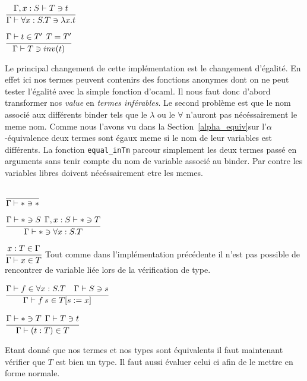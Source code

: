 \documentclass {article}
\newcommand{\codefrom}[3]
           {}
\theoremstyle{definition}
\theoremstyle{remark}
\newcommand{\fun}[1]{\lstinline!#1!}
\begin{document}
\codefrom{dependent}{lambda}{check_abs}
$\cfrac{\Gamma,x:S\vdash T \ni t}
    {\Gamma \vdash \forall x:S.T \ni \lambda x. t}$



\codefrom{dependent}{lambda}{check_inv}
$\cfrac{\Gamma \vdash t \in T' \:\: T=T'}
    {\Gamma\vdash T \ni inv(t)}$

Le principal changement de cette implémentation est le changement d'égalité. 
En effet ici nos termes peuvent contenirs des fonctions anonymes dont on ne peut 
tester l'égalité avec la simple fonction d'ocaml. Il nous faut donc d'abord transformer 
nos \emph{value} en \emph{termes inférables}. Le second problème est que le nom associé 
aux différents binder tels que le $\lambda$ ou le $\forall$ n'auront pas nécéssairement le 
meme nom. Comme nous l'avons vu dans la Section~\ref{alpha_equiv}sur l'$\alpha$-équivalence 
deux termes sont égaux meme si le nom de leur variables est différents. 
La fonction \fun{equal_inTm} parcour simplement les deux termes passé en arguments sans tenir compte
du nom de variable associé au binder. Par contre les variables libres doivent nécéssairement etre les memes.

\codefrom{dependent}{lambda}{check_star}
$\cfrac{}
    {\Gamma \vdash * \ni *}$



\codefrom{dependent}{lambda}{check_pi}
$\cfrac{\Gamma \vdash * \ni S\:\:\Gamma,x:S \vdash *\ni T}
    {\Gamma\vdash * \ni \forall x:S.T}$





\codefrom{dependent}{lambda}{synth_var}
$\cfrac{x:T \in \Gamma}
    {\Gamma \vdash x \in T }$
Tout comme dans l'implémentation précédente il n'est pas possible de rencontrer de variable 
liée lors de la vérification de type.

\codefrom{dependent}{lambda}{synth_app}

$\cfrac{\Gamma \vdash f \in \forall x:S.T \quad \Gamma\vdash S \ni s }
    {\Gamma\vdash f\:s\in T[s := x]}$



\codefrom{dependent}{lambda}{synth_ann}

$\cfrac{\Gamma\vdash * \ni T \:\:\Gamma\vdash T \ni t}
    {\Gamma\vdash (t:T) \in T}$

Etant donné que nos termes et nos types sont équivalents il faut maintenant vérifier que 
$T$ est bien un type. Il faut aussi évaluer celui ci afin de le mettre en forme normale.
\end{document}
